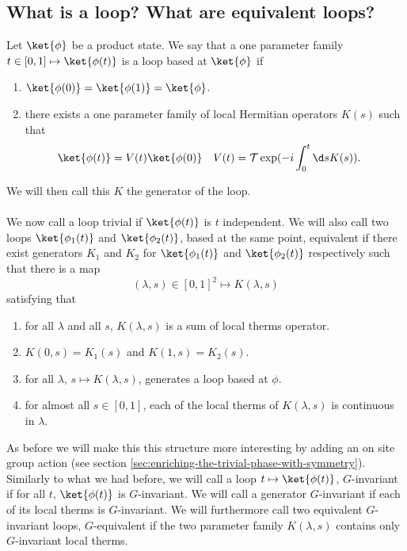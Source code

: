 \subsection{What is a loop? What are equivalent loops?}
Let $\ket{\phi}$ be a product state. We say that a one parameter family $t\in[0,1]\mapsto \ket{\phi(t)}$ is a loop based at $\ket{\phi}$ if
\begin{enumerate}
	\item $\ket{\phi(0)}=\ket{\phi(1)}=\ket{\phi}$.
	\item there exists a one parameter family of local Hermitian operators $K(s)$ such that
	\begin{align}
		\ket{\phi(t)}&=V(t)\ket{\phi(0)}&V(t)&=\mathcal{T}\exp(-i\int_{0}^{t}\d s K(s)).
	\end{align}
\end{enumerate}
We will then call this $K$ the generator of the loop.\\\\
We now call a loop trivial if $\ket{\phi(t)}$ is $t$ independent. We will also call two loops $\ket{\phi_1(t)}$ and $\ket{\phi_2(t)}$, based at the same point, equivalent if there exist generators $K_1$ and $K_2$ for $\ket{\phi_1(t)}$ and $\ket{\phi_2(t)}$ respectively such that there is a map
\begin{equation}
	(\lambda,s)\in[0,1]^2\mapsto K(\lambda,s) 
\end{equation}
satisfying that
\begin{enumerate}
	\item for all $\lambda$ and all $s$, $K(\lambda,s)$ is a sum of local therms operator.
	\item $K(0,s)=K_1(s)$ and $K(1,s)=K_2(s)$.
	\item for all $\lambda$, $s\mapsto K(\lambda,s)$, generates a loop based at $\phi$.
	\item for almost all $s\in[0,1]$, each of the local therms of $K(\lambda,s)$ is continuous in $\lambda$.
\end{enumerate}
As before we will make this this structure more interesting by adding an on site group action (see section \ref{sec:enriching-the-trivial-phase-with-symmetry}). Similarly to what we had before, we will call a loop $t\mapsto\ket{\phi(t)}$, $G$-invariant if for all $t$, $\ket{\phi(t)}$ is $G$-invariant. We will call a generator $G$-invariant if each of its local therms is $G$-invariant. We will furthermore call two equivalent $G$-invariant loops, $G$-equivalent if the two parameter family $K(\lambda,s)$ contains only $G$-invariant local therms.\\\\
